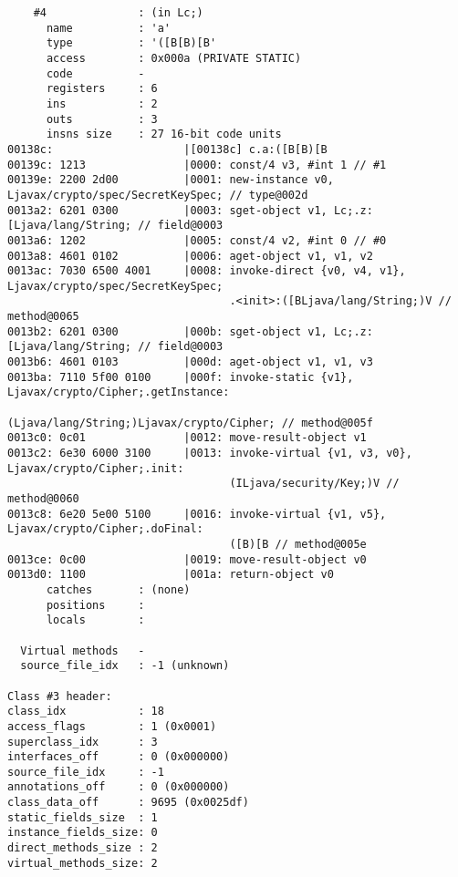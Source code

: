 \begin{lstlisting}
    #4              : (in Lc;)
      name          : 'a'
      type          : '([B[B)[B'
      access        : 0x000a (PRIVATE STATIC)
      code          -
      registers     : 6
      ins           : 2
      outs          : 3
      insns size    : 27 16-bit code units
00138c:                    |[00138c] c.a:([B[B)[B
00139c: 1213               |0000: const/4 v3, #int 1 // #1
00139e: 2200 2d00          |0001: new-instance v0, Ljavax/crypto/spec/SecretKeySpec; // type@002d
0013a2: 6201 0300          |0003: sget-object v1, Lc;.z:[Ljava/lang/String; // field@0003
0013a6: 1202               |0005: const/4 v2, #int 0 // #0
0013a8: 4601 0102          |0006: aget-object v1, v1, v2
0013ac: 7030 6500 4001     |0008: invoke-direct {v0, v4, v1}, Ljavax/crypto/spec/SecretKeySpec;
                                  .<init>:([BLjava/lang/String;)V // method@0065
0013b2: 6201 0300          |000b: sget-object v1, Lc;.z:[Ljava/lang/String; // field@0003
0013b6: 4601 0103          |000d: aget-object v1, v1, v3
0013ba: 7110 5f00 0100     |000f: invoke-static {v1}, Ljavax/crypto/Cipher;.getInstance:
                                  (Ljava/lang/String;)Ljavax/crypto/Cipher; // method@005f
0013c0: 0c01               |0012: move-result-object v1
0013c2: 6e30 6000 3100     |0013: invoke-virtual {v1, v3, v0}, Ljavax/crypto/Cipher;.init:
                                  (ILjava/security/Key;)V // method@0060
0013c8: 6e20 5e00 5100     |0016: invoke-virtual {v1, v5}, Ljavax/crypto/Cipher;.doFinal:
                                  ([B)[B // method@005e
0013ce: 0c00               |0019: move-result-object v0
0013d0: 1100               |001a: return-object v0
      catches       : (none)
      positions     :
      locals        :

  Virtual methods   -
  source_file_idx   : -1 (unknown)

Class #3 header:
class_idx           : 18
access_flags        : 1 (0x0001)
superclass_idx      : 3
interfaces_off      : 0 (0x000000)
source_file_idx     : -1
annotations_off     : 0 (0x000000)
class_data_off      : 9695 (0x0025df)
static_fields_size  : 1
instance_fields_size: 0
direct_methods_size : 2
virtual_methods_size: 2


\end{lstlisting}
